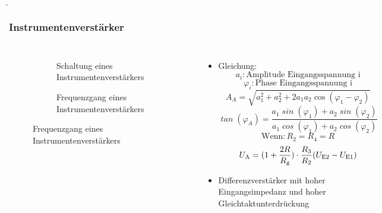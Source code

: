 \begin{frame}
    \b{
        \frametitle{Instrumentenverstärker}
        \begin{columns}
            \centering
            \begin{figure}
                \centering
                \begin{subfigure}{\linewidth}
                    \centering
                    \scalebox{1}{}
                    \caption{Schaltung eines Instrumentenverstärkers}
                \end{subfigure}
                \begin{subfigure}{\linewidth}
                    \centering
                    \scalebox{0.7}{}
                    \caption{Frequenzgang eines Instrumentenverstärkers}
                \end{subfigure}
            \end{figure}

            \raggedleft
            \begin{itemize}
                \item Gleichung:
                      \[
                          \mathit{a_i} : \text{Amplitude Eingangsspannung i}
                      \]
                      \[
                          \mathit{\varphi_i} : \text{Phase Eingangsspannung i}
                      \]
                      \[
                          \mathit{A}_{A} = \sqrt{a_1^2 + a_2^2 + 2a_1a_2 \cos(\varphi_1 - \varphi_2)}
                      \]
                      \[
                          \mathit{\tan}(\varphi_A) = \frac{a_1 \mathit{\sin}(\varphi_1) + a_2 \mathit{\sin}(\varphi_2)}{a_1 \mathit{\cos}(\varphi_1) + a_2 \mathit{\cos}(\varphi_2)}
                      \]
                      \[
                          \text{Wenn} : R_2 = R_4 = R
                      \]
                      \[
                          U_{\textnormal{A}} = (1+ \frac{2R} {R_{\textnormal{g}}}) \cdot \frac{R_3} {R_2} (U_{\textnormal{E2}}-U_{\textnormal{E1}})
                      \]
                \item Differenzverstärker mit hoher Eingangsimpedanz und hoher Gleichtaktunterdrückung
            \end{itemize}
        \end{columns}
    }
\end{frame}


